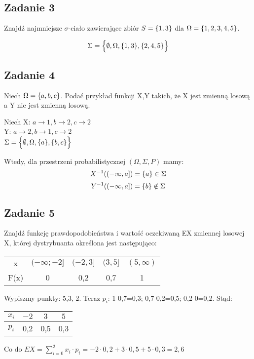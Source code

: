 \documentclass[a4paper]{article}
\DeclarePairedDelimiter\set{\lbrace}{\rbrace}
\begin{document}
\subsection*{Zadanie 3}
Znajdź najmniejsze $\sigma$-ciało zawierające zbiór $S=\set{1,3}$ dla $\Omega = \set{1,2,3,4,5}$.

$$\Sigma = \Big\{ \emptyset, \Omega, \set{1,3}, \set{2,4,5} \Big\}$$

\subsection*{Zadanie 4}
Niech $\Omega = \set{a,b,c}$. Podać przykład funkcji X,Y takich, że X jest zmienną losową a Y nie jest zmienną losową.

Niech X: $a\rightarrow 1, b\rightarrow 2, c\rightarrow 2$\\
Y: $a\rightarrow 2, b\rightarrow 1, c\rightarrow 2$\\
$\Sigma = \Big\{ \emptyset, \Omega, \set{a}, \set{b,c} \Big\}$

Wtedy, dla przestrzeni probabilistycznej $(\Omega, \Sigma, P)$ mamy:
$$X^{-1}((-\infty,a])=\set{a} \in \Sigma$$
$$Y^{-1}((-\infty,a])=\set{b} \notin \Sigma$$

\subsection*{Zadanie 5}
Znajdź funkcję prawdopodobieństwa i wartość oczekiwaną EX zmiennej losowej X, której dystrybuanta określona jest następująco:
\begin{tabular}{*{5}{c}}
x & $(-\infty; -2]$ & $(-2,3]$ & $(3,5]$ & $(5,\infty)$\\
F(x) & 0 & 0,2 & 0,7 & 1
\end{tabular}

Wypiszmy punkty: 5,3,-2.
Teraz $p_i$: 1-0,7=0,3; 0,7-0,2=0,5; 0,2-0=0,2. Stąd:

\begin{tabular}{*{4}{c|}}
$x_i$ & $-2$ & $3$ & $5$\\ \hline
$p_i$ & 0,2 & 0,5 & 0,3
\end{tabular}

Co do $EX=\sum\limits_{i=0}^2 x_i\cdot p_i = -2\cdot 0,2 + 3\cdot 0,5 + 5\cdot 0,3 = 2,6$
\end{document}
